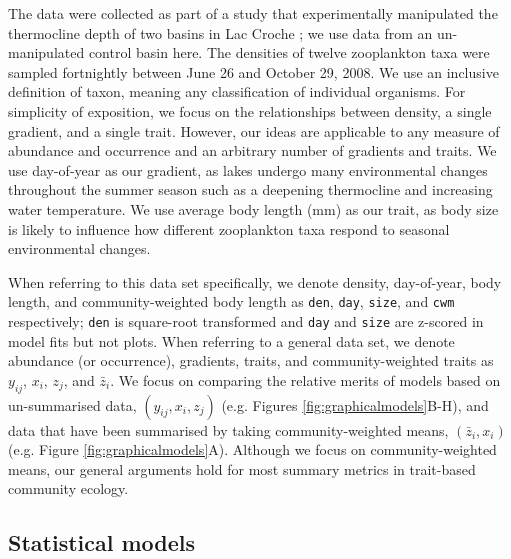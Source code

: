 \documentclass[12pt]{ecology}
\begin{document}
The data were collected as part of a study that experimentally manipulated the thermocline depth of two basins in Lac Croche \citep{CantinEtAl2011}; we use data from an un-manipulated control basin here.  The densities of twelve zooplankton taxa were sampled fortnightly between June 26 and October 29, 2008.  We use an inclusive definition of taxon, meaning any classification of individual organisms.  For simplicity of exposition, we focus on the relationships between density, a single gradient, and a single trait.  However, our ideas are applicable to any measure of abundance and occurrence and an arbitrary number of gradients and traits.  We use day-of-year as our gradient, as lakes undergo many environmental changes throughout the summer season such as a deepening thermocline and increasing water temperature.  We use average body length (mm) as our trait, as body size is likely to influence how different zooplankton taxa respond to seasonal environmental changes.   %

When referring to this data set specifically, we denote density, day-of-year, body length, and community-weighted body length as \texttt{den}, \texttt{day}, \texttt{size}, and \texttt{cwm} respectively; \texttt{den} is square-root transformed and \texttt{day} and \texttt{size} are z-scored in model fits but not plots.  When referring to a general data set, we denote abundance (or occurrence), gradients, traits, and community-weighted traits as $y_{ij}$, $x_i$, $z_j$, and $\bar{z}_i$.  We focus on comparing the relative merits of models based on un-summarised data, $(y_{ij}, x_i, z_j)$ (e.g. Figures \ref{fig:graphicalmodels}B-H), and data that have been summarised by taking community-weighted means, $(\bar{z}_i, x_i)$ (e.g. Figure \ref{fig:graphicalmodels}A).  Although we focus on community-weighted means, our general arguments hold for most summary metrics in trait-based community ecology.

\subsection{Statistical models}
\end{document}
